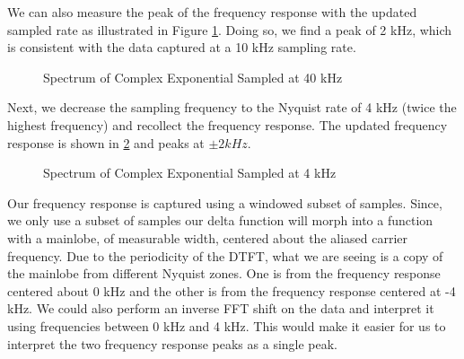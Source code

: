 \documentclass{article}
\begin{document}
We can also measure the peak of the frequency response with the updated sampled rate as illustrated in Figure \ref{fig::complex_sampling_freq_domain_40k_samp_rate}. Doing so, we find a peak of 2 kHz, which is consistent with the data captured at a 10 kHz sampling rate.

\begin{figure}[H]
	\centerline{}
	\caption{Spectrum of Complex Exponential Sampled at 40 kHz}
	\label{fig::complex_sampling_freq_domain_40k_samp_rate}
\end{figure}

Next, we decrease the sampling frequency to the Nyquist rate of 4 kHz (twice the highest frequency) and recollect the frequency response. The updated frequency response is shown in \ref{fig::complex_sampling_freq_domain_4k_samp_rate} and peaks at $\pm 2 kHz$.

\begin{figure}[H]
	\centerline{}
	\caption{Spectrum of Complex Exponential Sampled at 4 kHz}
	\label{fig::complex_sampling_freq_domain_4k_samp_rate}
\end{figure}

Our frequency response is captured using a windowed subset of samples. Since, we only use a subset of samples our delta function will morph into a function with a mainlobe, of measurable width, centered about the aliased carrier frequency. Due to the periodicity of the DTFT, what we are seeing is a copy of the mainlobe from different Nyquist zones. One is from the frequency response centered about 0 kHz and the other is from the frequency response centered at -4 kHz. We could also perform an inverse FFT shift on the data and interpret it using frequencies between 0 kHz and 4 kHz. This would make it easier for us to interpret the two frequency response peaks as a single peak.
\end{document}
